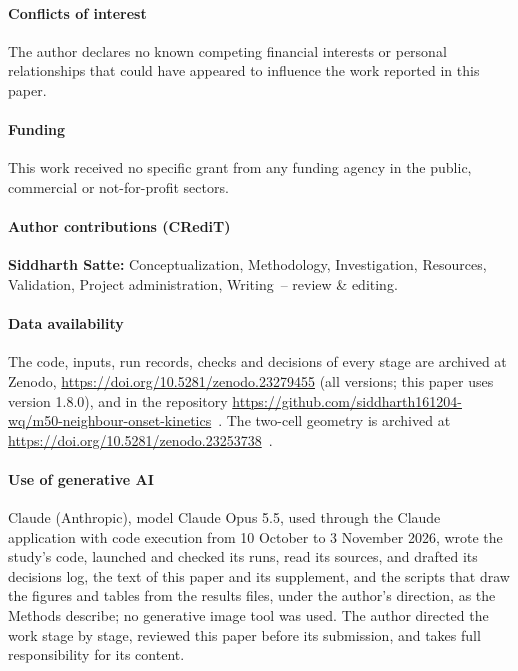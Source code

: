 \documentclass[preprint,12pt]{elsarticle}
\begin{document}
\paragraph{Conflicts of interest} The author declares no known competing financial interests or personal relationships that could have appeared to influence the work reported in this paper.

\paragraph{Funding} This work received no specific grant from any funding agency in the public, commercial or not-for-profit sectors.

\paragraph{Author contributions (CRediT)} \textbf{Siddharth Satte:} Conceptualization, Methodology, Investigation, Resources, Validation, Project administration, Writing~-- review \& editing.

\paragraph{Data availability} The code, inputs, run records, checks and decisions of every stage are archived at Zenodo, \url{https://doi.org/10.5281/zenodo.23279455} (all versions; this paper uses version 1.8.0), and in the repository \url{https://github.com/siddharth161204-wq/m50-neighbour-onset-kinetics}~\cite{satte2026repo}. The two-cell geometry is archived at \url{https://doi.org/10.5281/zenodo.23253738}~\cite{satte2026twocell}.

\paragraph{Use of generative AI} Claude (Anthropic), model Claude Opus 5.5, used through the Claude application with code execution from 10 October to 3 November 2026, wrote the study's code, launched and checked its runs, read its sources, and drafted its decisions log, the text of this paper and its supplement, and the scripts that draw the figures and tables from the results files, under the author's direction, as the Methods describe; no generative image tool was used. The author directed the work stage by stage, reviewed this paper before its submission, and takes full responsibility for its content.
\end{document}
